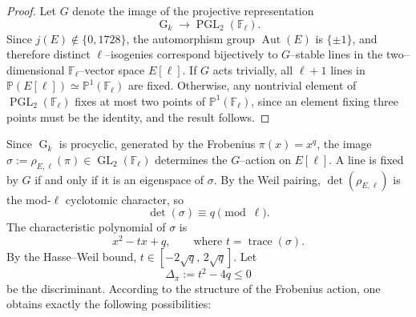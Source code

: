 \documentclass[table]{amsart}
\newcommand{\F}{\mathbb{F}}
\newcommand{\op}[1]{\operatorname{#1}}
\numberwithin{equation}{section}
\begin{document}
\begin{proof}
Let $G$ denote the image of the projective representation
\[
\op{G}_k \longrightarrow \op{PGL}_2(\F_\ell).
\]
Since $j(E)\notin\{0,1728\}$, the automorphism group $\op{Aut}(E)$ is $\{\pm 1\}$, and therefore distinct $\ell$–isogenies correspond bijectively to $G$–stable lines in the two–dimensional $\F_\ell$–vector space $E[\ell]$. If $G$ acts trivially, all $\ell+1$ lines in $\mathbb{P}(E[\ell])\simeq \mathbb{P}^1(\F_\ell)$ are fixed. Otherwise, any nontrivial element of $\op{PGL}_2(\F_\ell)$ fixes at most two points of $\mathbb{P}^1(\F_\ell)$, since an element fixing three points must be the identity, and the result follows.
\end{proof}

\par
Since $\op{G}_k$ is procyclic, generated by the Frobenius $\pi(x)=x^q$, the image $\sigma:=\rho_{E,\ell}(\pi)\in\op{GL}_2(\F_\ell)$ determines the $G$–action on $E[\ell]$. A line is fixed by $G$ if and only if it is an eigenspace of $\sigma$. By the Weil pairing, $\det(\rho_{E,\ell})$ is the mod-$\ell$ cyclotomic character, so
\[
\det(\sigma)\equiv q \pmod{\ell}.
\]
The characteristic polynomial of $\sigma$ is
\[
x^2 - t x + q,
\qquad\text{where } t=\operatorname{trace}(\sigma).
\]
By the Hasse–Weil bound, $t\in[-2\sqrt{q},\,2\sqrt{q}]$. Let
\[
\Delta_\pi := t^2-4q \le 0
\]
be the discriminant. According to the structure of the Frobenius action, one obtains exactly the following possibilities:
\end{document}
